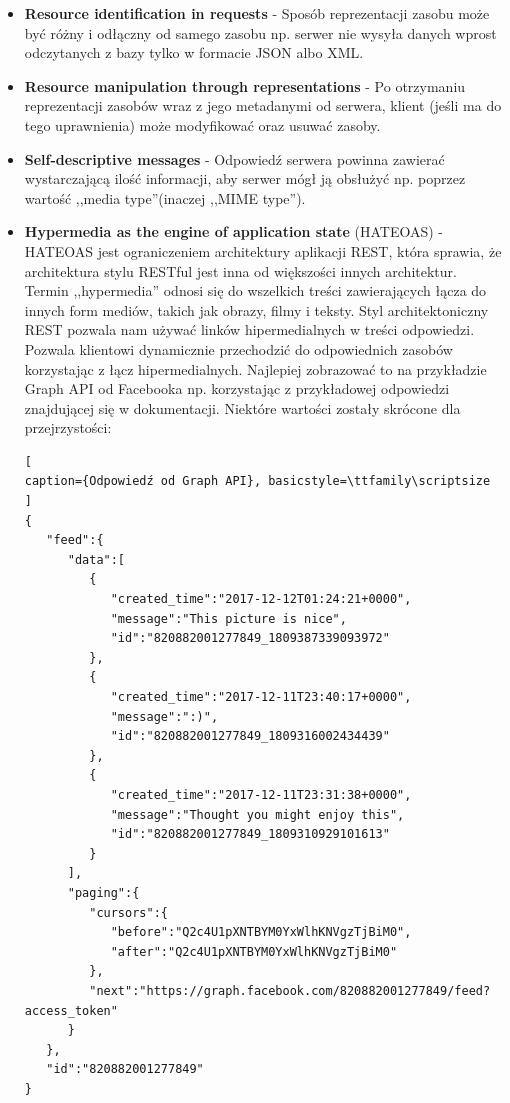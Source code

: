 \documentclass[oneside,polski,logo,indent]{amuthesis}
\begin{document}
\begin{itemize}
\begin{itemize}
\item \textbf{Resource identification in requests} - Sposób reprezentacji zasobu może być różny i odłączny od samego zasobu np. serwer nie wysyła danych wprost odczytanych z bazy tylko w formacie JSON albo XML.\newline 
\item \textbf{Resource manipulation through representations} - Po otrzymaniu reprezentacji zasobów wraz z jego metadanymi od serwera, klient (jeśli ma do tego uprawnienia) może modyfikować oraz usuwać zasoby.\newline 
\item \textbf{Self-descriptive messages} - Odpowiedź serwera powinna zawierać wystarczającą ilość informacji, aby serwer mógł ją obsłużyć np. poprzez wartość ,,media type''(inaczej ,,MIME type'').\newline 
\item \textbf{Hypermedia as the engine of application state} (HATEOAS) - HATEOAS jest ograniczeniem architektury aplikacji REST, która sprawia, że architektura stylu RESTful jest inna od większości innych architektur. Termin ,,hypermedia'' odnosi się do wszelkich treści zawierających łącza do innych form mediów, takich jak obrazy, filmy i teksty. Styl architektoniczny REST pozwala nam używać linków hipermedialnych w treści odpowiedzi. Pozwala klientowi dynamicznie przechodzić do odpowiednich zasobów korzystając z łącz hipermedialnych. Najlepiej zobrazować to na przykładzie Graph API od Facebooka np. korzystając z przykładowej odpowiedzi znajdującej się w dokumentacji. Niektóre wartości zostały skrócone dla przejrzystości: 


\begin{lstlisting}[
caption={Odpowiedź od Graph API}, basicstyle=\ttfamily\scriptsize
]
{
   "feed":{
      "data":[
         {
            "created_time":"2017-12-12T01:24:21+0000",
            "message":"This picture is nice",
            "id":"820882001277849_1809387339093972"
         },
         {
            "created_time":"2017-12-11T23:40:17+0000",
            "message":":)",
            "id":"820882001277849_1809316002434439"
         },
         {
            "created_time":"2017-12-11T23:31:38+0000",
            "message":"Thought you might enjoy this",
            "id":"820882001277849_1809310929101613"
         }
      ],
      "paging":{
         "cursors":{
            "before":"Q2c4U1pXNTBYM0YxWlhKNVgzTjBiM0",
            "after":"Q2c4U1pXNTBYM0YxWlhKNVgzTjBiM0"
         },
         "next":"https://graph.facebook.com/820882001277849/feed?access_token"
      }
   },
   "id":"820882001277849"
}
\end{lstlisting}


\end{itemize}
\end{itemize}
\end{document}
